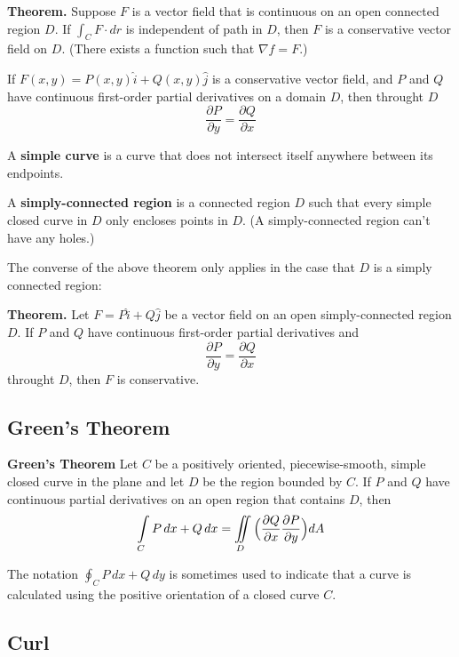 \textbf{Theorem.} Suppose $F$ is a vector field that is continuous on an open connected region $D$. If $\int_C F \cdot dr$ is independent of path in $D$, then $F$ is a conservative vector field on $D$. (There exists a function such that $\nabla f = F$.)

If $F(x,y) = P(x,y)\hat{i} + Q(x,y)\hat{j}$ is a conservative vector field, and $P$ and $Q$ have continuous first-order partial derivatives on a domain $D$, then throught $D$ $$\frac{\partial P}{\partial y} = \frac{\partial Q}{\partial x}$$

A \textbf{simple curve} is a curve that does not intersect itself anywhere between its endpoints.

A \textbf{simply-connected region} is a connected region $D$ such that every simple closed curve in $D$ only encloses points in $D$. (A simply-connected region can't have any holes.)

The converse of the above theorem only applies in the case that $D$ is a simply connected region:

\textbf{Theorem.} Let $F = P\hat{i} + Q\hat{j}$ be a vector field on an open simply-connected region $D$. If $P$ and $Q$ have continuous first-order partial derivatives and $$\frac{\partial P}{\partial y} = \frac{\partial Q}{\partial x}$$ throught $D$, then $F$ is conservative.

\subsection{Green's Theorem}

\textbf{Green's Theorem} Let $C$ be a positively oriented, piecewise-smooth, simple closed curve in the plane and let $D$ be the region bounded by $C$. If $P$ and $Q$ have continuous partial derivatives on an open region that contains $D$, then $$\int\limits_{C} P \, dx + Q \, dx = \iint\limits_{D} \Big{(} \frac{\partial Q}{\partial x} \frac{\partial P}{\partial y}  \Big{)} dA$$

The notation $\oint_C P \, dx +  Q \, dy$ is sometimes used to indicate that a curve is calculated using the positive orientation of a closed curve $C$.

\subsection{Curl}

